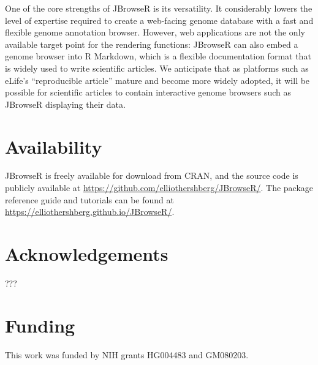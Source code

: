 \documentclass{bioinfo}
\begin{document}
One of the core strengths of JBrowseR is its versatility. It
considerably lowers the level of expertise required to
create a web-facing genome database with a fast and flexible genome annotation browser.
However, web applications are not the only available target point for the
rendering functions: JBrowseR can also embed a genome browser into R
Markdown, which is a flexible documentation format that is widely used
to write scientific articles. We anticipate that as platforms such as
eLife's ``reproducible article'' \citep{maciocci2019introducing} mature
and become more widely adopted, it will be possible for scientific
articles to contain interactive genome browsers such as JBrowseR
displaying their data.

\section{Availability}

JBrowseR is freely available for download from CRAN, and the source
code is publicly available at
\href{https://github.com/elliothershberg/JBrowseR/}{https://github.com/elliothershberg/JBrowseR/}.
The package reference guide and tutorials can be found at
\href{https://elliothershberg.github.io/JBrowseR/}{https://elliothershberg.github.io/JBrowseR/}.

\section*{Acknowledgements}

???

\section*{Funding}

This work was funded by NIH grants HG004483 and GM080203.



\end{document}
